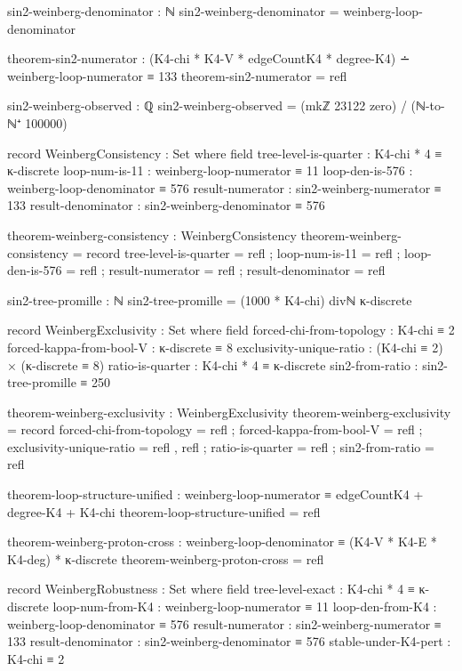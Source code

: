 \documentclass[11pt,a4paper]{book}
\begin{document}
\begin{code}
sin2-weinberg-denominator : ℕ
sin2-weinberg-denominator = weinberg-loop-denominator

theorem-sin2-numerator : (K4-chi * K4-V * edgeCountK4 * degree-K4) ∸ weinberg-loop-numerator ≡ 133
theorem-sin2-numerator = refl

sin2-weinberg-observed : ℚ
sin2-weinberg-observed = (mkℤ 23122 zero) / (ℕ-to-ℕ⁺ 100000)

record WeinbergConsistency : Set where
  field
    tree-level-is-quarter : K4-chi * 4 ≡ κ-discrete
    loop-num-is-11 : weinberg-loop-numerator ≡ 11
    loop-den-is-576 : weinberg-loop-denominator ≡ 576
    result-numerator : sin2-weinberg-numerator ≡ 133
    result-denominator : sin2-weinberg-denominator ≡ 576

theorem-weinberg-consistency : WeinbergConsistency
theorem-weinberg-consistency = record
  { tree-level-is-quarter = refl
  ; loop-num-is-11 = refl
  ; loop-den-is-576 = refl
  ; result-numerator = refl
  ; result-denominator = refl
  }

sin2-tree-promille : ℕ
sin2-tree-promille = (1000 * K4-chi) divℕ κ-discrete

record WeinbergExclusivity : Set where
  field
    forced-chi-from-topology   : K4-chi ≡ 2
    forced-kappa-from-bool-V   : κ-discrete ≡ 8
    exclusivity-unique-ratio   : (K4-chi ≡ 2) × (κ-discrete ≡ 8)
    ratio-is-quarter           : K4-chi * 4 ≡ κ-discrete
    sin2-from-ratio            : sin2-tree-promille ≡ 250

theorem-weinberg-exclusivity : WeinbergExclusivity
theorem-weinberg-exclusivity = record
  { forced-chi-from-topology = refl
  ; forced-kappa-from-bool-V = refl
  ; exclusivity-unique-ratio = refl , refl
  ; ratio-is-quarter = refl
  ; sin2-from-ratio = refl
  }

theorem-loop-structure-unified : weinberg-loop-numerator ≡ edgeCountK4 + degree-K4 + K4-chi
theorem-loop-structure-unified = refl

theorem-weinberg-proton-cross : weinberg-loop-denominator ≡ (K4-V * K4-E * K4-deg) * κ-discrete
theorem-weinberg-proton-cross = refl

record WeinbergRobustness : Set where
  field
    tree-level-exact         : K4-chi * 4 ≡ κ-discrete
    loop-num-from-K4         : weinberg-loop-numerator ≡ 11
    loop-den-from-K4         : weinberg-loop-denominator ≡ 576
    result-numerator         : sin2-weinberg-numerator ≡ 133
    result-denominator       : sin2-weinberg-denominator ≡ 576
    stable-under-K4-pert     : K4-chi ≡ 2


\end{code}
\end{document}
